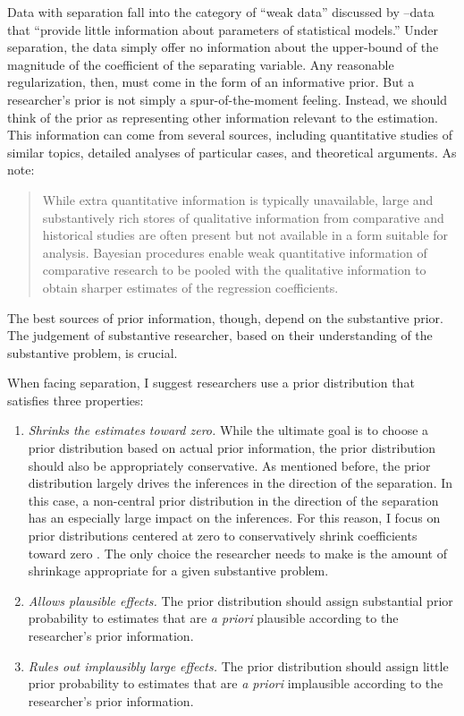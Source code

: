 \documentclass[12pt]{article}
\begin{document}
Data with separation fall into the category of ``weak data'' discussed by \cite{WesternJackman1994}--data that ``provide little information about parameters of statistical models.''
Under separation, the data simply offer no information about the upper-bound of the magnitude of the coefficient of the separating variable. 
Any reasonable regularization, then, must come in the form of an informative prior. 
But a researcher's prior is not simply a spur-of-the-moment feeling. 
Instead, we should think of the prior as representing other information relevant to the estimation. 
This information can come from several sources, including quantitative studies of similar topics, detailed analyses of particular cases, and theoretical arguments.
As \citet[p. 415]{WesternJackman1994} note:
\begin{quote}
While extra quantitative information is typically unavailable, large and substantively rich stores of qualitative information from comparative and historical studies are often present but not available in a form suitable for analysis. 
Bayesian procedures enable weak quantitative information of comparative research to be pooled with the qualitative information to obtain sharper estimates of the regression coefficients.
\end{quote}
The best sources of prior information, though, depend on the substantive prior. 
The judgement of substantive researcher, based on their understanding of the substantive problem, is crucial.

When facing separation, I suggest researchers use a prior distribution that satisfies three properties:
\begin{enumerate}
\item \emph{Shrinks the estimates toward zero.} 
While the ultimate goal is to choose a prior distribution based on actual prior information, the prior distribution should also be appropriately conservative.
As mentioned before, the prior distribution largely drives the inferences in the direction of the separation. 
In this case, a non-central prior distribution in the direction of the separation has an especially large impact on the inferences. 
For this reason, I focus on prior distributions centered at zero to conservatively shrink coefficients toward zero \citep{GelmanJakulin2007}. 
The only choice the researcher needs to make is the amount of shrinkage appropriate for a given substantive problem.
\item \emph{Allows plausible effects.} 
The prior distribution should assign substantial prior probability to estimates that are \textit{a priori} plausible according to the researcher's prior information.
\item \emph{Rules out implausibly large effects.} 
The prior distribution should assign little prior probability to estimates that are \textit{a priori} implausible according to the researcher's prior information.\end{enumerate}
\end{document}
